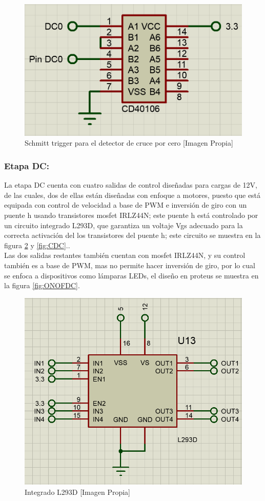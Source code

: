 		\begin{figure}[H]
			\centering
			\caption{Schmitt trigger para el detector de cruce por cero [Imagen Propia]}
			\label{fig:DC02}
			\includegraphics[width=0.5\linewidth]{Imagenes/DC02}
		\end{figure}
	
	\subsubsection{Etapa DC:}
		La etapa DC cuenta con cuatro salidas de control diseñadas para cargas de 12V, de las cuales, dos de ellas están diseñadas con enfoque a motores, puesto que está equipada con control de velocidad a base de PWM e inversión de giro con un puente h usando transistores mosfet IRLZ44N; este puente h está controlado por un circuito integrado L293D, que garantiza un voltaje Vgs adecuado para la correcta activación del los transistores del puente h; este circuito se muestra en la figura \ref{fig:L293D} y \ref{fig:CDC}.\cite{IRL}.\\
		
		Las dos salidas restantes también cuentan con mosfet IRLZ44N, y su control también es a base de PWM, mas no permite hacer inversión de giro, por lo cual se enfoca a dispositivos como lámparas LEDs, el diseño en proteus se muestra en la figura \ref{fig:ONOFDC}.\\
		
		\begin{figure}[H]
			\centering
			\caption{Integrado L293D [Imagen Propia]}
			\label{fig:L293D}
			\includegraphics[width=0.5\linewidth]{Imagenes/L293D}
		\end{figure}
		
